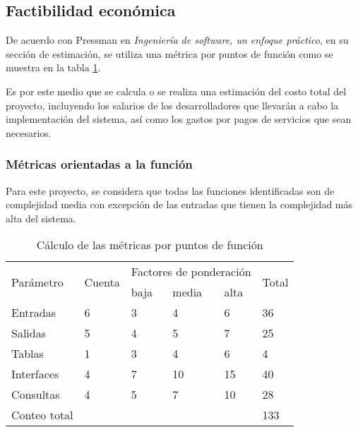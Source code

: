 \subsection{Factibilidad económica}

De acuerdo con Pressman en \textit{Ingeniería de software, un enfoque práctico}\cite{pressman_software_2005}, en su sección de estimación, se utiliza una métrica por puntos de función como se muestra en la tabla \ref{tab:function_point_metrics}.


Es por este medio que se calcula o se realiza una estimación del costo total del proyecto, incluyendo los salarios de los desarrolladores que llevarán a cabo la implementación del sistema, así como los gastos por pagos de servicios que sean necesarios.

\subsubsection{Métricas orientadas a la función}


Para este proyecto, se considera que todas las funciones identificadas son de complejidad media con excepción de las entradas que tienen la complejidad más alta del sistema.


\begin{table}[h!]
	\begin{tabular}{|l|l|l|l|l|l|}
	\hline
	\multirow{2}{*}{Parámetro} & \multirow{2}{*}{Cuenta} & \multicolumn{3}{|l|}{Factores de ponderación} & \multirow{2}{*}{Total} \\ \cline{3-5}
														 &                         & baja       	& media       & alta		       &                        \\ \hline
	Entradas                   & 6                       & 3            & 4           & 6              & 36                     \\ \hline
	Salidas                     & 5                       & 4            & 5           & 7              & 25                     \\ \hline
	Tablas                     & 1                       & 3            & 4           & 6              & 4                      \\ \hline
	Interfaces                 & 4                       & 7            & 10          & 15             & 40                     \\ \hline
	Consultas                  & 4                       & 5            & 7           & 10             & 28                     \\ \hline
	Conteo total               &                         &              &             &		             & 133                    \\ \hline
	\end{tabular}
	\caption{Cálculo de las métricas por puntos de función}
	\label{tab:function_point_metrics}
	\end{table}


